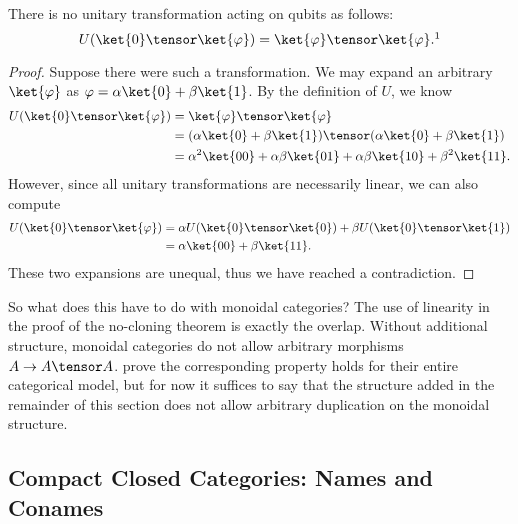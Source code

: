 \begin{theorem}
    There is no unitary transformation acting on qubits as follows:
    \[ U(\ket{0}\tensor\ket{\varphi}) = \ket{\varphi}\tensor\ket{\varphi}.\footnotemark \]
\end{theorem}
\begin{proof}
    Suppose there were such a transformation. We may expand an arbitrary $\ket{\varphi}$
    as $\varphi = \alpha\ket{0} + \beta\ket{1}$. By the definition of $U$, we know
    \begin{align*} 
        U(\ket{0} \tensor \ket{\varphi})
        &= \ket{\varphi} \tensor \ket{\varphi} \\
        &= (\alpha\ket{0} + \beta\ket{1}) \tensor (\alpha\ket{0} + \beta\ket{1}) \\
        &= \alpha^2 \ket{00} + \alpha\beta\ket{01} + \alpha\beta\ket{10} + \beta^2\ket{11}.
    \end{align*}
    However, since all unitary transformations are necessarily linear, we can also compute
    \begin{align*}
        U(\ket{0} \tensor \ket{\varphi})
        &= \alpha U(\ket{0} \tensor \ket{0}) + \beta U(\ket{0} \tensor \ket{1}) \\
        &= \alpha \ket{00} + \beta \ket{11}.
    \end{align*}
    These two expansions are unequal, thus we have reached a contradiction. 
\end{proof}

So what does this have to do with monoidal categories? 
The use of linearity in the proof of the no-cloning theorem is exactly the overlap.
Without additional structure, monoidal categories do not allow arbitrary
morphisms $A \rightarrow A \tensor A$. \cite{abramsky2009categorical}
prove the corresponding property holds for their entire categorical model,
but for now it suffices to say that the structure added in the remainder
of this section does not allow arbitrary duplication on the monoidal structure.

\subsection{Compact Closed Categories: Names and Conames}

